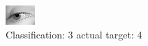 \begin{figure}[h!]
\begin{center}
\includegraphics[width=0.60\columnwidth]{figures/ID2963_class_3_target_4.png}
\end{center}
\caption{ Classification: 3 actual target: 4}
\label{fig:ID2963_class_3_target_4}
\end{figure}
